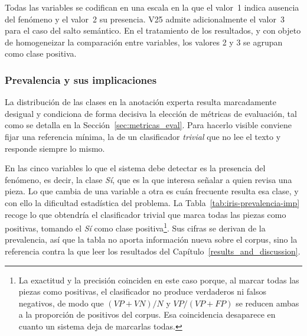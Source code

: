 Todas las variables se codifican en una escala en la que el valor~1 indica
ausencia del fenómeno y el valor~2 su presencia. V25 admite adicionalmente el
valor~3 para el caso del salto semántico. En el tratamiento de los resultados,
y con objeto de homogeneizar la comparación entre variables, los valores 2 y 3
se agrupan como clase positiva.

\subsubsection{Prevalencia y sus implicaciones}

La distribución de las clases en la anotación experta resulta marcadamente
desigual y condiciona de forma decisiva la elección de métricas de evaluación,
tal como se detalla en la Sección~\ref{sec:metricas_eval}. Para hacerlo
visible conviene fijar una referencia mínima, la de un clasificador
\emph{trivial} que no lee el texto y responde siempre lo mismo.

En las cinco variables lo que el sistema debe detectar es la presencia del
fenómeno, es decir, la clase \textit{Sí}, que es la que interesa señalar a quien
revisa una pieza. Lo que cambia de una variable a otra es cuán frecuente resulta
esa clase, y con ello la dificultad estadística del problema. La
Tabla~\ref{tab:iris-prevalencia-imp} recoge lo que obtendría el clasificador
trivial que marca todas las piezas como positivas, tomando el \textit{Sí} como
clase positiva\footnote{La exactitud y
la precisión coinciden en este caso porque, al marcar todas las piezas como
positivas, el clasificador no produce verdaderos ni falsos negativos, de modo que
$(VP+VN)/N$ y $VP/(VP+FP)$ se reducen ambas a la proporción de positivos del
corpus. Esa coincidencia desaparece en cuanto un sistema deja de marcarlas
todas.}. Sus cifras se derivan de la prevalencia, así que la tabla no
aporta información nueva sobre el corpus, sino la referencia contra la que leer
los resultados del Capítulo~\ref{results_and_discussion}.

